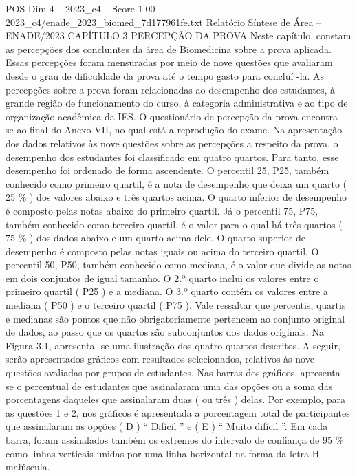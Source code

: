 \begin{textsample}{POS Dim 4 – 2023\_c4 – Score 1.00 – 2023\_c4/enade\_2023\_biomed\_7d177961fe.txt}  \label{ex:f4_pos_173}
Relatório Síntese de Área – ENADE/2023 CAPÍTULO 3 PERCEPÇÃO DA PROVA Neste capítulo, constam as percepções dos concluintes da área de Biomedicina sobre a prova aplicada.
Essas percepções foram mensuradas por meio de nove questões que avaliaram desde o grau de dificuldade da prova até o tempo gasto para concluí -la.
As percepções sobre a prova foram relacionadas ao desempenho dos estudantes, à grande região de funcionamento do curso, à categoria administrativa e ao tipo de organização acadêmica da IES.
O questionário de percepção da prova encontra -se ao final do Anexo VII, no qual está a reprodução do exame.
Na apresentação dos dados relativos às nove questões sobre as percepções a respeito da prova, o desempenho dos estudantes foi classificado em quatro quartos.
Para tanto, esse desempenho foi ordenado de forma ascendente.
O percentil 25, P25, também conhecido como primeiro quartil, é a nota de desempenho que deixa um quarto ( 25 \% ) dos valores abaixo e três quartos acima.
O quarto inferior de desempenho é composto pelas notas abaixo do primeiro quartil.
Já o percentil 75, P75, também conhecido como terceiro quartil, é o valor para o qual há três quartos ( 75 \% ) dos dados abaixo e um quarto acima dele.
O quarto superior de desempenho é composto pelas notas iguais ou acima do terceiro quartil.
O percentil 50, P50, também conhecido como mediana, é o valor que divide as notas em dois conjuntos de igual tamanho.
O 2.º quarto inclui os valores entre o primeiro quartil ( P25 ) e a mediana.
O 3.º quarto contém os valores entre a mediana ( P50 ) e o terceiro quartil ( P75 ).
Vale ressaltar que percentis, quartis e medianas são pontos que não obrigatoriamente pertencem ao conjunto original de dados, ao passo que os quartos são subconjuntos dos dados originais.
Na Figura 3.1, apresenta -se uma ilustração dos quatro quartos descritos.
A seguir, serão apresentados gráficos com resultados selecionados, relativos às nove questões avaliadas por grupos de estudantes.
Nas barras dos gráficos, apresenta -se o percentual de estudantes que assinalaram uma das opções ou a soma das porcentagens daqueles que assinalaram duas ( ou três ) delas.
Por exemplo, para as questões 1 e 2, nos gráficos é apresentada a porcentagem total de participantes que assinalaram as opções ( D ) “ Difícil ” e ( E ) “ Muito difícil ”.
Em cada barra, foram assinalados também os extremos do intervalo de confiança de 95 \% como linhas verticais unidas por uma linha horizontal na forma da letra H maiúscula.

\end{textsample}
